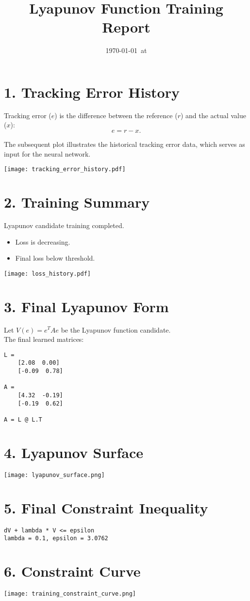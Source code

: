 \documentclass[11pt]{article}
\title{Lyapunov Function Training Report}
\author{}
\date{\today\ at \currenttime}
\begin{document}
\maketitle
\thispagestyle{fancy}

\section*{1. Tracking Error History}
Tracking error ($e$) is the difference between the reference ($r$) and the actual value ($x$):
\begin{equation}
e = r - x.
\end{equation}

\indent The subsequent plot illustrates the historical tracking error data, which serves as input for the neural network.

\texttt{[image: tracking\_error\_history.pdf]}

\section*{2. Training Summary}
Lyapunov candidate training completed.
\begin{itemize}
  \item  Loss is decreasing.
  \item  Final loss below threshold.
\end{itemize}

\texttt{[image: loss\_history.pdf]}

\section*{3. Final Lyapunov Form}
Let $V(e) = e^T A e$ be the Lyapunov function candidate. \\
The final learned matrices:
\begin{verbatim}
L = 
    [2.08  0.00]
    [-0.09  0.78]

A = 
    [4.32  -0.19]
    [-0.19  0.62]

A = L @ L.T
\end{verbatim}

\section*{4. Lyapunov Surface}
\texttt{[image: lyapunov\_surface.png]}

\section*{5. Final Constraint Inequality}
\begin{verbatim}
dV + lambda * V <= epsilon
lambda = 0.1, epsilon = 3.0762\end{verbatim}

\section*{6. Constraint Curve}
\texttt{[image: training\_constraint\_curve.png]}
\end{document}
